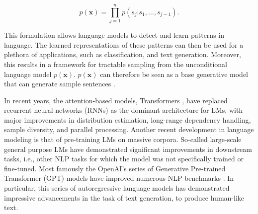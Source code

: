 \begin{equation}
    p(\textbf{x}) = \prod_{j = 1}^n  p(s_j | s_1, ..., s_{j - 1}).
\end{equation}

This formulation allows language models to detect and learn patterns in language. The learned representations of these patterns can then be used for a plethora of applications, such as classification, and text generation. Moreover, this results in a framework for tractable sampling from the unconditional language model $p(\textbf{x})$. $p(\textbf{x})$ can therefore be seen as a base generative model that can generate sample sentences \citep{dathathri2019plug}.

In recent years, the attention-based models, Transformers \citep{vaswani2017attention}, have replaced recurrent neural networks (RNNs) as the dominant architecture for LMs, with major improvements in distribution estimation, long-range dependency handling, sample diversity, and parallel processing. Another recent development in language modeling is that of pre-training LMs on massive corpora. So-called large-scale general purpose LMs have demonstrated significant improvements in downstream tasks, i.e., other NLP tasks for which the model was not specifically trained or fine-tuned. Most famously the OpenAI's series of Generative Pre-trained Transformer (GPT) models have improved numerous NLP benchmarks \citep{radford2018improving,radford2019language,brown2020language-models-few-shot-gpt3}. In particular, this series of autoregressive language models has demonstrated impressive advancements in the task of text generation, to produce human-like text.





